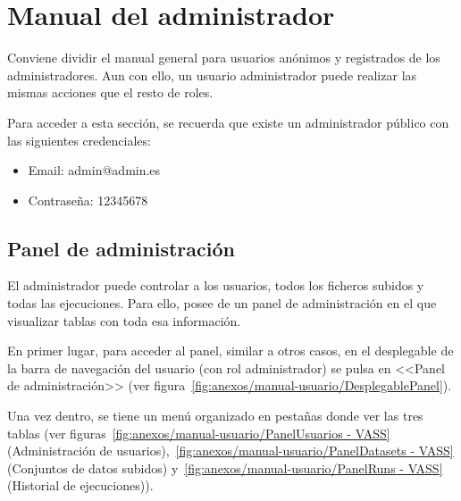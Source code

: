 

\section{Manual del administrador}

Conviene dividir el manual general para usuarios anónimos y registrados de los
administradores. Aun con ello, un usuario administrador puede realizar las
mismas acciones que el resto de roles.

Para acceder a esta sección, se recuerda que existe un administrador público con
las siguientes credenciales:
\begin{itemize}
    \item Email: admin@admin.es
    \item Contraseña: 12345678
\end{itemize}

\subsection{Panel de administración}

El administrador puede controlar a los usuarios, todos los ficheros subidos y
todas las ejecuciones. Para ello, posee de un panel de administración en el que
visualizar tablas con toda esa información.

En primer lugar, para acceder al panel, similar a otros casos, en el desplegable
de la barra de navegación del usuario (con rol administrador) se pulsa en
<<Panel de administración>> (ver
figura~\ref{fig:anexos/manual-usuario/DesplegablePanel}).


Una vez dentro, se tiene un menú organizado en pestañas donde ver las tres
tablas (ver figuras~\ref{fig:anexos/manual-usuario/PanelUsuarios - VASS}
(Administración de usuarios),~\ref{fig:anexos/manual-usuario/PanelDatasets -
VASS} (Conjuntos de datos subidos) y~\ref{fig:anexos/manual-usuario/PanelRuns -
VASS} (Historial de ejecuciones)).




